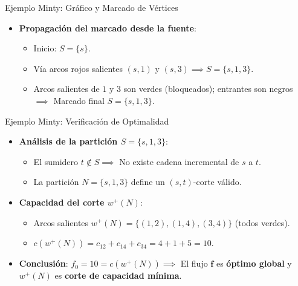 \documentclass[
  ignorenonframetext,
]{beamer}
\providecommand{\tightlist}{%
  \setlength{\itemsep}{0pt}\setlength{\parskip}{0pt}}
\begin{document}
\begin{frame}{Ejemplo Minty: Gráfico y Marcado de Vértices}
\label{ejemplo-minty-gruxe1fico-y-marcado-de-vuxe9rtices}
\begin{itemize}
\tightlist
\item
  \textbf{Propagación del marcado desde la fuente}:

  \begin{itemize}
  \tightlist
  \item
    Inicio: \(S = \{s\}\).
  \item
    Vía arcos rojos salientes \((s,1)\) y
    \((s,3) \implies S = \{s, 1, 3\}\).
  \item
    Arcos salientes de \(1\) y \(3\) son verdes (bloqueados); entrantes
    son negros \(\implies\) Marcado final \(S = \{s, 1, 3\}\).
  \end{itemize}
\end{itemize}
\end{frame}

\begin{frame}{Ejemplo Minty: Verificación de Optimalidad}
\label{ejemplo-minty-verificaciuxf3n-de-optimalidad}
\begin{itemize}
\tightlist
\item
  \textbf{Análisis de la partición \(S = \{s, 1, 3\}\)}:

  \begin{itemize}
  \tightlist
  \item
    El sumidero \(t \notin S \implies\) No existe cadena incremental de
    \(s\) a \(t\).
  \item
    La partición \(N = \{s, 1, 3\}\) define un \((s, t)\)-corte válido.
  \end{itemize}
\item
  \textbf{Capacidad del corte \(w^+(N)\)}:

  \begin{itemize}
  \tightlist
  \item
    Arcos salientes \(w^+(N) = \{(1,2), (1,4), (3,4)\}\) (todos verdes).
  \item
    \(c(w^+(N)) = c_{12} + c_{14} + c_{34} = 4 + 1 + 5 = 10\).
  \end{itemize}
\item
  \textbf{Conclusión}: \(f_0 = 10 = c(w^+(N)) \implies\) El flujo
  \(\mathbf{f}\) es \textbf{óptimo global} y \(w^+(N)\) es \textbf{corte
  de capacidad mínima}.
\end{itemize}
\end{frame}
\end{document}
